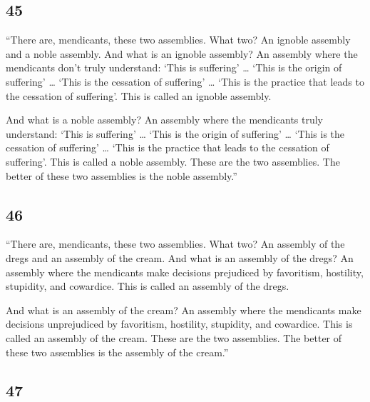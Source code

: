 \documentclass[12pt,openany]{book}%
\begin{document}
\subsection*{45 }

“There are, mendicants, these two assemblies. What two? An ignoble assembly and a noble assembly. And what is an ignoble assembly? An assembly where the mendicants don’t truly understand: ‘This is suffering’ … ‘This is the origin of suffering’ … ‘This is the cessation of suffering’ … ‘This is the practice that leads to the cessation of suffering’. This is called an ignoble assembly. 

And what is a noble assembly? An assembly where the mendicants truly understand: ‘This is suffering’ … ‘This is the origin of suffering’ … ‘This is the cessation of suffering’ … ‘This is the practice that leads to the cessation of suffering’. This is called a noble assembly. These are the two assemblies. The better of these two assemblies is the noble assembly.” 

\subsection*{46 }

“There are, mendicants, these two assemblies. What two? An assembly of the dregs and an assembly of the cream. And what is an assembly of the dregs? An assembly where the mendicants make decisions prejudiced by favoritism, hostility, stupidity, and cowardice. This is called an assembly of the dregs. 

And what is an assembly of the cream? An assembly where the mendicants make decisions unprejudiced by favoritism, hostility, stupidity, and cowardice. This is called an assembly of the cream. These are the two assemblies. The better of these two assemblies is the assembly of the cream.” 

\subsection*{47 }
\end{document}
